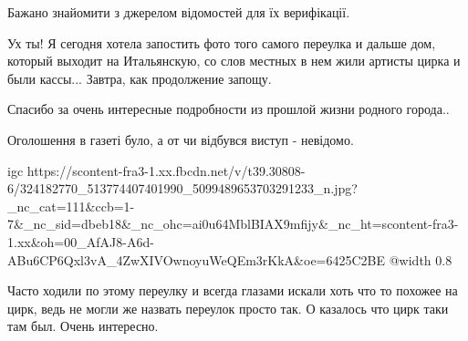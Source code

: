  
 
 
 
 

\qqSecCmt


Бажано знайомити з джерелом відомостей для їх верифікації.


Ух ты! Я сегодня хотела запостить фото того самого переулка и дальше дом,
который выходит на Итальянскую, со слов местных в нем жили артисты цирка и
были кассы... Завтра, как продолжение запощу.


Спасибо за очень интересные подробности из прошлой жизни родного города..


Оголошення в газеті було, а от чи відбувся виступ - невідомо.

\ifcmt
  igc https://scontent-fra3-1.xx.fbcdn.net/v/t39.30808-6/324182770_513774407401990_5099489653703291233_n.jpg?_nc_cat=111&ccb=1-7&_nc_sid=dbeb18&_nc_ohc=ai0u64MblBIAX9mfijy&_nc_ht=scontent-fra3-1.xx&oh=00_AfAJ8-A6d-ABu6CP6Qxl3vA_4ZwXIVOwnoyuWeQEm3rKkA&oe=6425C2BE
	@width 0.8
\fi


Часто ходили по этому переулку и всегда глазами искали хоть что то похожее на
цирк, ведь не могли же назвать переулок просто так. О казалось что цирк таки
там был. Очень интересно.
